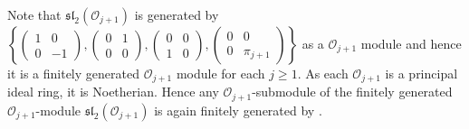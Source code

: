 \documentclass[10pt,twoside]{amsart}
\theoremstyle{definition}
\theoremstyle{definition}
\begin{document}
Note that $\mathfrak{sl}_2(\mathcal{O}_{j+1})$ is generated by $\left\{ \left(\begin{array}{cc} 1 & 0 \\  0 & -1 \end{array}\right), \left(\begin{array}{cc}  0 & 1 \\ 0 & 0
\end{array}\right), \left(\begin{array}{cc} 0 & 0 \\ 1 & 0 \end{array}\right), \left(\begin{array}{cc} 0 & 0 \\ 0 & \pi_{j+1}
\end{array}\right)\right\}$ as a $\mathcal{O}_{j+1}$ module and hence it is a finitely generated $\mathcal{O}_{j+1}$ module for each $j \geq 1$. As each $\mathcal{O}_{j+1}$ is a principal ideal ring, it is Noetherian. Hence any $\mathcal{O}_{j+1}$-submodule of the finitely generated $\mathcal{O}_{j+1}$-module $\mathfrak{sl}_2(\mathcal{O}_{j+1})$ is again finitely generated by \cite[Proposition 6.2 and 6.5]{Atiyahmacdonald}. 
\end{document}
